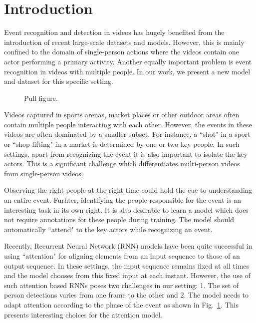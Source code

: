 
\section{Introduction}

Event recognition and detection in videos has hugely benefited from the
introduction of recent large-scale datasets \cite{THUMOS,UCF101,Karpathy_CVPR14,MED11} and models.
However, this is mainly confined to the domain of single-person actions
where the videos contain one actor performing a primary activity.
Another equally important problem is event recognition in
videos with multiple people. In our work, we present a new model
and dataset for this specific setting.

\begin{figure}[ht!]
\begin{center}
\fbox{\rule{0pt}{2in} \rule{.9\linewidth}{0pt}}
\end{center}
   \caption{Pull figure.}
\label{fig:pull_figure}
\end{figure}

Videos captured in sports arenas, market places or other outdoor areas
often contain multiple people interacting with each other.
However, the events in these videos are often
dominated by a smaller subset. For instance, a ``shot" in a sport
or ``shop-lifting" in a market is determined by one or two key people.
In such settings, apart from recognizing the event it is also important
to isolate the key actors. This is a significant challenge which
differentiates multi-person videos from single-person videos.

Observing the right people at the right time could hold the cue to
understanding an entire event. Furhter, identifying the people responsible for
the event is an interesting task in its own right.  It is also desirable to
learn a model which does not require annotations for these people during
training. The model should automatically ``attend" to the key actors while recognizing an event.

Recently, Recurrent Neural Network (RNN) models have been quite successful in
using ``attention" \cite{Bahdnau_arxiv14,Xu_arxiv15,Yao_arxiv15} for aligning
elements from an input sequence to those of an output sequence. In these settings,
the input sequence remains fixed at all times and the model chooses from this
fixed input at each instant. However, the use of such attention based RNNs
poses two challenges in our setting:
1. The set of person detections varies from one frame to the other and
2. The model needs to adapt attention according to the phase of the event as
shown in Fig.~\ref{fig:pull_figure}. This presents interesting choices
for the attention model.

